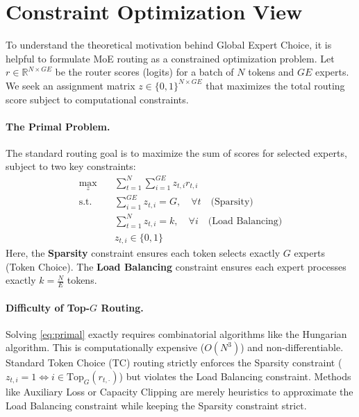 \documentclass{article}
\theoremstyle{plain}
\theoremstyle{definition}
\theoremstyle{remark}
\begin{document}




\appendix

\section{Constraint Optimization View}
\label{app:constraint_view}

To understand the theoretical motivation behind Global Expert Choice, it is helpful to formulate MoE routing as a constrained optimization problem. Let $r \in \mathbb{R}^{N \times GE}$ be the router scores (logits) for a batch of $N$ tokens and $GE$ experts. We seek an assignment matrix $z \in \{0, 1\}^{N \times GE}$ that maximizes the total routing score subject to computational constraints.

\paragraph{The Primal Problem.}
The standard routing goal is to maximize the sum of scores for selected experts, subject to two key constraints:
\begin{equation}
\label{eq:primal}
\begin{aligned}
\max_{z} \quad & \sum_{t=1}^N \sum_{i=1}^{GE} z_{t,i} r_{t,i} \\
\text{s.t.} \quad & \sum_{i=1}^{GE} z_{t,i} = G, \quad \forall t \quad \text{(Sparsity)} \\
& \sum_{t=1}^N z_{t,i} = k, \quad \forall i \quad \text{(Load Balancing)} \\
& z_{t,i} \in \{0, 1\}
\end{aligned}
\end{equation}
Here, the \textbf{Sparsity} constraint ensures each token selects exactly $G$ experts (Token Choice). The \textbf{Load Balancing} constraint ensures each expert processes exactly $k = \frac{N}{E}$ tokens.

\paragraph{Difficulty of Top-$G$ Routing.}
Solving \eqref{eq:primal} exactly requires combinatorial algorithms like the Hungarian algorithm. This is computationally expensive ($O(N^3)$) and non-differentiable.
Standard Token Choice (TC) routing strictly enforces the Sparsity constraint ($z_{t,i} = 1 \iff i \in \text{Top}_G(r_{t, \cdot})$) but violates the Load Balancing constraint. Methods like Auxiliary Loss or Capacity Clipping are merely heuristics to approximate the Load Balancing constraint while keeping the Sparsity constraint strict.
\end{document}
